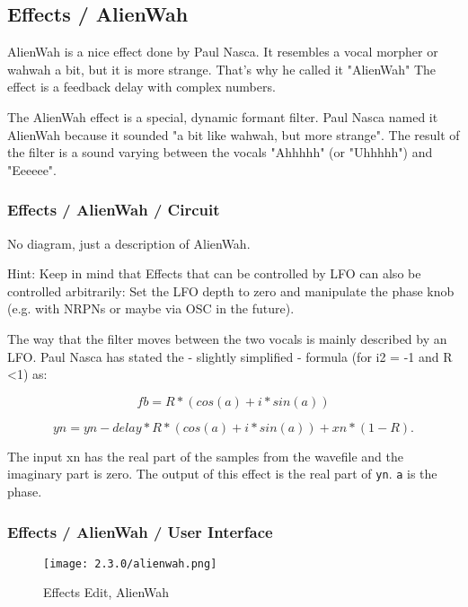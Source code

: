 
\subsection{Effects / AlienWah}
\label{subsec:effects_edit_alienwah}

   AlienWah is a nice effect done by Paul Nasca. It resembles a vocal morpher
   or wahwah a bit, but it is more strange. That's why he called it "AlienWah"
   The effect is a feedback delay with complex numbers.

   The AlienWah effect is a special, dynamic formant filter.
   Paul Nasca named it AlienWah because it sounded "a bit like
   wahwah, but more strange". The result of the filter is a sound varying
   between the vocals "Ahhhhh" (or "Uhhhhh") and "Eeeeee".

\subsubsection{Effects / AlienWah / Circuit}
\label{subsubsec:effects_edit_alienwah_circuit}

   No diagram, just a description of AlienWah.

   Hint: Keep in mind that Effects that can be controlled by LFO can also be
   controlled arbitrarily: Set the LFO depth to zero and manipulate the phase
   knob (e.g. with NRPNs or maybe via OSC in the future).

   The way that the filter moves between the two vocals is mainly described
   by an LFO. Paul Nasca has stated the - slightly simplified - formula (for
   i2 = -1 and R \textless 1) as:

   \[fb=R*(cos(a)+i*sin(a))\]

   \[yn=yn-delay*R*(cos(a)+i*sin(a))+xn*(1-R).\]

   The input xn has the real part of the samples from the wavefile and the
   imaginary part is zero. The output of this effect is the real part of
   \texttt{yn}.
   \texttt{a} is the phase.

\subsubsection{Effects / AlienWah / User Interface}
\label{subsubsec:effects_edit_alienwah_ui}

\begin{figure}[H]
   \centering
   \texttt{[image: 2.3.0/alienwah.png]}
   \caption{Effects Edit, AlienWah}
   \label{fig:effects_edit_alienwah}
\end{figure}

